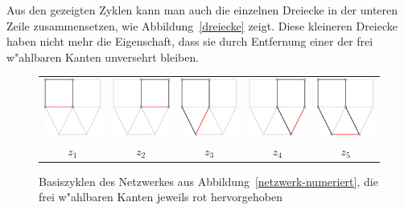 Aus den gezeigten Zyklen
kann man auch die einzelnen Dreiecke in der unteren Zeile zusammensetzen,
wie Abbildung~\ref{dreiecke} zeigt. Diese kleineren Dreiecke haben nicht
mehr die Eigenschaft, dass sie durch Entfernung einer der frei w"ahlbaren
Kanten unversehrt bleiben.
\begin{figure}
\begin{center}
\begin{tabular}{ccccc}
\includegraphics[width=0.17\hsize]{images/kirchhoff-10}&
\includegraphics[width=0.17\hsize]{images/kirchhoff-6}&
\includegraphics[width=0.17\hsize]{images/kirchhoff-7}&
\includegraphics[width=0.17\hsize]{images/kirchhoff-8}&
\includegraphics[width=0.17\hsize]{images/kirchhoff-9}\\
$z_1$&
$z_2$&
$z_3$&
$z_4$&
$z_5$\\
\end{tabular}
\end{center}
\caption{Basiszyklen des Netzwerkes aus
Abbildung~\ref{netzwerk-numeriert},
die frei w"ahlbaren Kanten jeweils rot hervorgehoben
\label{basiszyklen}}
\end{figure}

